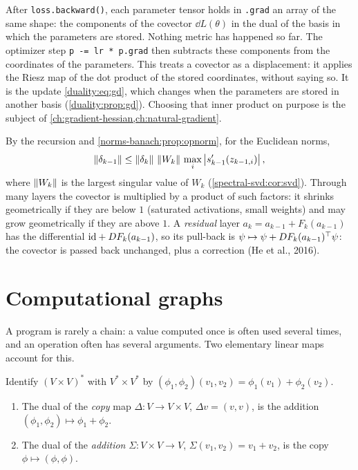 \begin{notechapter}
\begin{mlthread}
After \texttt{loss.backward()}, each parameter tensor holds in
\texttt{.grad} an array of the same shape: the components of the covector
$\dd L(\theta)$ in the dual of the basis in which the parameters are
stored. Nothing metric has happened so far. The optimizer step
\texttt{p -= lr * p.grad} then subtracts these components from the
coordinates of the parameters. This treats a covector as a displacement:
it applies the Riesz map of the dot product of the stored coordinates,
without saying so. It is the update \eqref{duality:eq:gd}, which changes
when the parameters are stored in another basis
(\cref{duality:prop:gd}). Choosing that inner product on purpose is the
subject of \cref{ch:gradient-hessian,ch:natural-gradient}.
\end{mlthread}

\begin{mlthread}
By the recursion and \cref{norms-banach:prop:opnorm}, for the Euclidean
norms,
\[
  \left\|\delta_{k-1}\right\|\leq\left\|\delta_k\right\|\,\left\|W_k\right\|\,
  \max_i\left|s_{k-1}'(z_{k-1,i})\right| ,
\]
where $\left\|W_k\right\|$ is the largest singular value of $W_k$
(\cref{spectral-svd:cor:svd}). Through many layers the covector is
multiplied by a product of such factors: it shrinks geometrically if they
are below $1$ (saturated activations, small weights) and may grow
geometrically if they are above $1$. A \emph{residual} layer
$a_k = a_{k-1} + F_k(a_{k-1})$ has the differential $\mathrm{id} + DF_k(a_{k-1})$,
so its pull-back is $\psi\mapsto\psi + DF_k(a_{k-1})^{\top}\psi$: the
covector is passed back unchanged, plus a correction (He et al., 2016).
\end{mlthread}

\section{Computational graphs}\label{chain-rule-autodiff:sec:graphs}

A program is rarely a chain: a value computed once is often used several
times, and an operation often has several arguments. Two elementary linear
maps account for this.

\begin{lemma}\label{chain-rule-autodiff:lem:copy}
Identify $(V\times V)^*$ with $V^*\times V^*$ by
$(\phi_1, \phi_2)(v_1, v_2) = \phi_1(v_1) + \phi_2(v_2)$.
\begin{enumerate}[nosep]
  \item The dual of the \emph{copy} map $\Delta:V\to V\times V$,
        $\Delta v = (v, v)$, is the addition
        $(\phi_1, \phi_2)\mapsto\phi_1 + \phi_2$.
  \item The dual of the \emph{addition} $\Sigma:V\times V\to V$,
        $\Sigma(v_1, v_2) = v_1 + v_2$, is the copy
        $\phi\mapsto(\phi, \phi)$.
\end{enumerate}
\end{lemma}


\end{notechapter}
